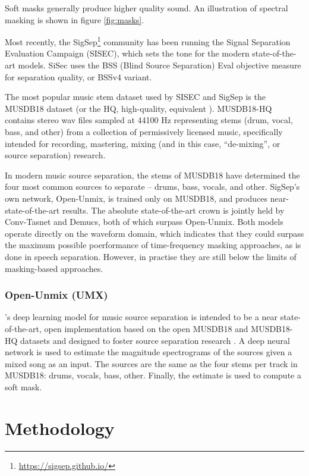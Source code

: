 \documentclass[letter,12pt,notitlepage]{article}
\begin{document}
Soft masks generally produce higher quality sound. An illustration of spectral masking is shown in figure \ref{fig:masks}.

Most recently, the SigSep\footnote{\url{https://sigsep.github.io/}} community has been running the Signal Separation Evaluation Campaign (SISEC), which sets the tone for the modern state-of-the-art models. SiSec uses the BSS (Blind Source Separation) Eval \cite{bss} objective measure for separation quality, or BSSv4 variant.

The most popular music stem dataset used by SISEC and SigSep is the MUSDB18 dataset \cite{musdb18} (or the HQ, high-quality, equivalent \cite{musdb18-hq}). MUSDB18-HQ contains stereo wav files sampled at 44100 Hz representing stems (drum, vocal, bass, and other) from a collection of permissively licensed music, specifically intended for recording, mastering, mixing (and in this case, ``de-mixing'', or source separation) research.

In modern music source separation, the stems of MUSDB18 have determined the four most common sources to separate -- drums, bass, vocals, and other. SigSep's own network, Open-Unmix, is trained only on MUSDB18, and produces near-state-of-the-art results. The absolute state-of-the-art crown is jointly held by Conv-Tasnet and Demucs, both of which surpass Open-Unmix. Both models operate directly on the waveform domain, which indicates that they could surpass the maximum possible poerformance of time-frequency masking approaches, as is done in speech separation. However, in practise they are still below the limits of masking-based approaches.

\subsubsection{Open-Unmix (UMX)}

 \textcite{umx}'s deep learning model for music source separation is intended to be a near state-of-the-art, open implementation based on the open MUSDB18 and MUSDB18-HQ datasets and designed to foster source separation research \cite{musdb18, musdb18hq}. A deep neural network is used to estimate the magnitude spectrograms of the sources given a mixed song as an input. The sources are the same as the four stems per track in MUSDB18: drums, vocals, bass, other. Finally, the estimate is used to compute a soft mask.

\vfill
\clearpage

\section{Methodology}
\end{document}
